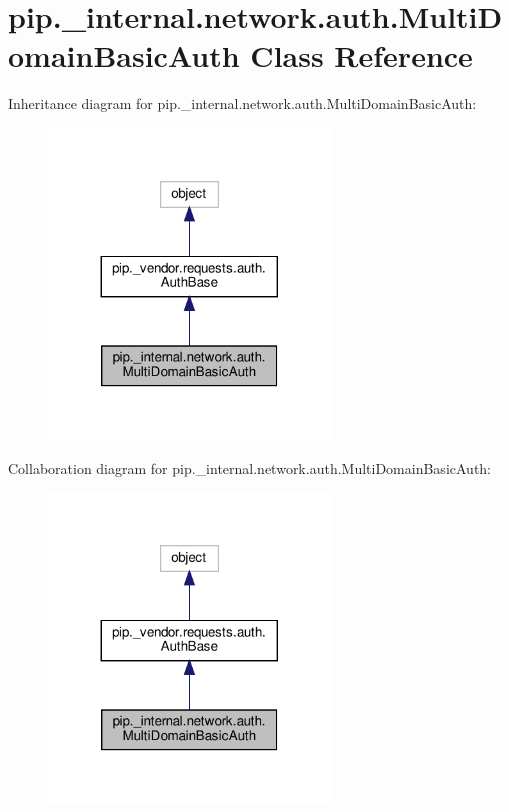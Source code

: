 \hypertarget{classpip_1_1__internal_1_1network_1_1auth_1_1MultiDomainBasicAuth}{}\section{pip.\+\_\+internal.\+network.\+auth.\+Multi\+Domain\+Basic\+Auth Class Reference}
\label{classpip_1_1__internal_1_1network_1_1auth_1_1MultiDomainBasicAuth}


Inheritance diagram for pip.\+\_\+internal.\+network.\+auth.\+Multi\+Domain\+Basic\+Auth\+:
\nopagebreak
\begin{figure}[H]
\begin{center}
\leavevmode
\includegraphics[width=212pt]{classpip_1_1__internal_1_1network_1_1auth_1_1MultiDomainBasicAuth__inherit__graph}
\end{center}
\end{figure}


Collaboration diagram for pip.\+\_\+internal.\+network.\+auth.\+Multi\+Domain\+Basic\+Auth\+:
\nopagebreak
\begin{figure}[H]
\begin{center}
\leavevmode
\includegraphics[width=212pt]{classpip_1_1__internal_1_1network_1_1auth_1_1MultiDomainBasicAuth__coll__graph}
\end{center}
\end{figure}
